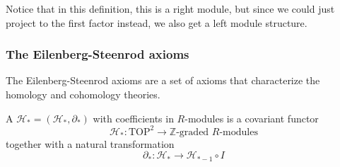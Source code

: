 \documentclass[a4paper,11pt]{article}
\begin{document}
\begin{remark}
    Notice that in this definition, this is a right module, but since we could just project to the first factor instead, we also get a left module structure.
\end{remark}

\subsubsection{The Eilenberg-Steenrod axioms}\label{es axioms}
The Eilenberg-Steenrod axioms are a set of axioms that characterize the homology and cohomology theories.

\begin{definition}
    A  \(\mathcal{H}_\ast=(\mathcal{H}_\ast,\partial_\ast)\) with coefficients in \(R\)-modules is a covariant functor\[\mathcal{H}_\ast:\mathrm{TOP}^2\to\mathbb{Z}\text{-graded }R\text{-modules}\]
    together with a natural transformation \[\partial_\ast:\mathcal{H}_\ast\to\mathcal{H}_{\ast-1}\circ I\]
    

\end{definition}
\end{document}
